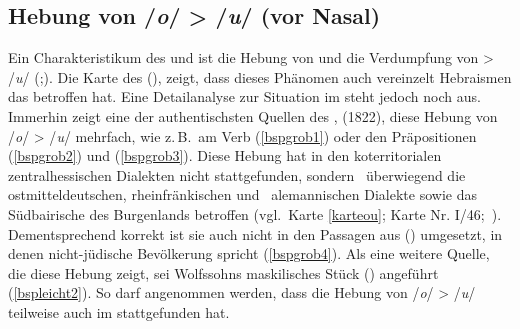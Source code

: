  \subsection{Hebung von /\textit{o}/ > /\textit{u}/ (vor Nasal)}\label{o_u} 

 Ein Charakteristikum des \hai{{\ZOJ}} und \hai{{\SOJ}} ist die Hebung von  und die Verdumpfung von  > /\textit{u}/ (\citealt[66]{Herzog1992};\citealt[28]{Beider2010}). Die Karte des  (\citeyear[66–68]{Herzog1992}), zeigt, dass dieses Phänomen auch vereinzelt Hebraismen das \hai{{\WJ}} betroffen hat. Eine Detailanalyse zur Situation im \hai{{\WJ}} steht jedoch noch aus. Immerhin zeigt eine der authentischsten Quellen des ,  (1822), diese Hebung von /\textit{o}/ > /\textit{u}/ mehrfach, wie z.\,B.\, am Verb  (\ref{bspgrob1}) oder den Präpositionen  (\ref{bspgrob2}) und  (\ref{bspgrob3}). Diese Hebung hat in den koterritorialen zentralhessischen Dialekten nicht stattgefunden, sondern \,%
 überwiegend die ostmitteldeutschen, rheinfränkischen und \,%
 alemannischen Dialekte sowie das Südbairische des Burgenlands betroffen (vgl.\, Karte \ref{karteou}; Karte Nr. I/46;\,  ). Dementsprechend korrekt ist sie auch nicht in den Passagen aus  () umgesetzt, in denen nicht-jüdische Bevölkerung spricht (\ref{bspgrob4}). Als eine weitere Quelle, die diese Hebung zeigt, sei Wolfssohns maskilisches Stück   () angeführt (\ref{bspleicht2}). So darf angenommen werden, dass die Hebung von /\textit{o}/ > /\textit{u}/ teilweise auch im \hai{{\WJ}} stattgefunden hat.

